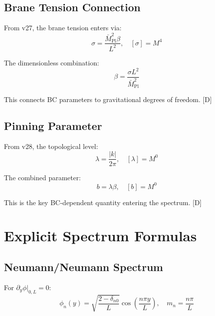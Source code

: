 \documentclass[11pt,a4paper]{article}
\newcommand{\tagD}{\textcolor{blue!70!black}{[D]}}
\begin{document}
\subsection{Brane Tension Connection}

From v27, the brane tension enters via:
\begin{equation}
\label{eq:dim-sigma}
\sigma = \frac{\bar{M}_{\text{Pl}}^2 \beta}{L^2}, \quad [\sigma] = M^4
\end{equation}

The dimensionless combination:
\begin{equation}
\label{eq:dim-beta}
\beta = \frac{\sigma L^2}{\bar{M}_{\text{Pl}}^2}
\end{equation}

This connects BC parameters to gravitational degrees of freedom. \tagD

\subsection{Pinning Parameter}

From v28, the topological level:
\begin{equation}
\label{eq:dim-lambda}
\lambda = \frac{|k|}{2\pi}, \quad [\lambda] = M^0
\end{equation}

The combined parameter:
\begin{equation}
\label{eq:dim-b}
b = \lambda \beta, \quad [b] = M^0
\end{equation}

This is the key BC-dependent quantity entering the spectrum. \tagD

\section{Explicit Spectrum Formulas}

\subsection{Neumann/Neumann Spectrum}

For $\partial_y \phi|_{0,L} = 0$:
\begin{equation}
\label{eq:spec-NN}
\phi_n(y) = \sqrt{\frac{2-\delta_{n0}}{L}} \cos\left(\frac{n\pi y}{L}\right), \quad m_n = \frac{n\pi}{L}
\end{equation}
\end{document}
